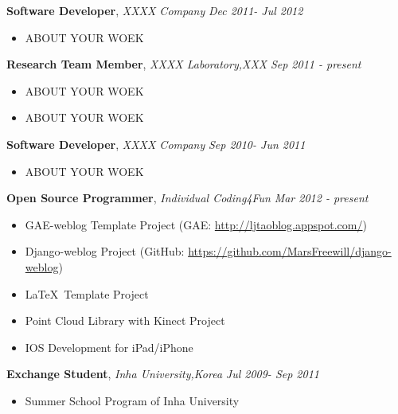 \documentclass[paper=a4]{article}
\newenvironment{changemargin}[2]{%
  \begin{list}{}{%
    \setlength{\topsep}{0pt}%
    \setlength{\leftmargin}{#1}%
    \setlength{\rightmargin}{#2}%
    \setlength{\listparindent}{\parindent}%
    \setlength{\itemindent}{\parindent}%
    \setlength{\parsep}{\parskip}%
  }%
  \item[]}{\end{list}
}
\newenvironment{body} {
	\vspace*{-16pt}
	\begin{changemargin}{-0.5in}{-0.5in}
  }	
	{\end{changemargin}
}
\begin{document}
\begin{body}
	\vspace{14pt}
	\textbf{Software Developer}, \emph{XXXX Company} \hfill \emph{Dec 2011- Jul 2012}\\
	\vspace*{-4pt}
	\begin{itemize} \itemsep -0pt  %
		\item[\HandRight] ABOUT YOUR WOEK
	\end{itemize}

	\textbf {Research Team Member}, \emph{XXXX Laboratory,XXX} \hfill \emph{Sep 2011 - present}\\
	\vspace*{-4pt}
	\begin{itemize} \itemsep -0pt
	         \item[\HandRight] ABOUT YOUR WOEK
		\item[\HandRight] ABOUT YOUR WOEK
	\end{itemize}
	
	\textbf{Software Developer}, \emph{XXXX Company} \hfill \emph{Sep 2010- Jun 2011}\\
	\vspace*{-4pt}
	\begin{itemize} \itemsep -0pt  %
		\item[\HandRight] ABOUT YOUR WOEK
	\end{itemize}
	
	\textbf{Open Source Programmer}, \emph{Individual Coding4Fun} \hfill \emph{Mar 2012 - present}\\
	\vspace*{-4pt}
	\begin{itemize} \itemsep -0pt  %
		\item[\HandRight] GAE-weblog Template Project (GAE: \url{http://ljtaoblog.appspot.com/})
		\item[\HandRight] Django-weblog Project (GitHub: \url{https://github.com/MarsFreewill/django-weblog})
		\item[\HandRight] \LaTeX  \ Template Project
		\item[\HandRight] Point Cloud Library with Kinect Project
		\item[\HandRight] IOS Development for iPad/iPhone
	\end{itemize}

	\textbf{Exchange Student}, \emph{Inha University,Korea} \hfill \emph{Jul 2009- Sep 2011}\\
	\vspace*{-4pt}
	\begin{itemize} \itemsep -0pt  %
		\item[\HandRight] Summer School Program of Inha University
	\end{itemize}
	
\end{body}
\end{document}
